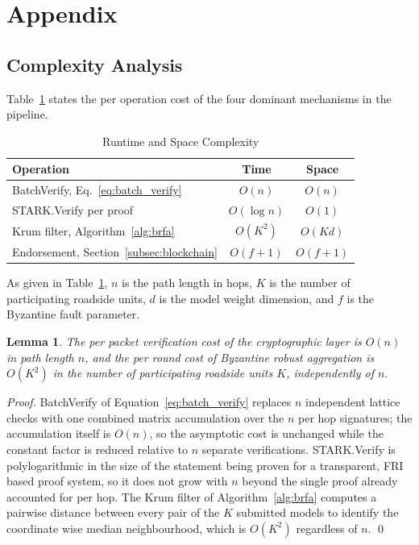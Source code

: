 \documentclass[lettersize,journal]{IEEEtran}
\theoremstyle{plain}
\newtheorem{lemma}{Lemma}
\theoremstyle{remark}
\begin{document}
	\section[\appendixname~\thesection]{Appendix}\label{appendix}
	
	\subsection{Complexity Analysis}\label{app:complexity}
	
	Table~\ref{tab:complexity} states the per operation cost of the four
	dominant mechanisms in the pipeline.
	\begin{table}[!t]
		\centering
		\caption{Runtime and Space Complexity}
		\label{tab:complexity}
		\renewcommand{\arraystretch}{1.2}
		\footnotesize
		\begin{tabular}{|l|c|c|}
			\hline
			\textbf{Operation} & \textbf{Time} & \textbf{Space} \\
			\hline
			BatchVerify, Eq.~\eqref{eq:batch_verify} & $O(n)$ & $O(n)$ \\
			\hline
			STARK.Verify per proof & $O(\log n)$ & $O(1)$ \\
			\hline
			Krum filter, Algorithm~\ref{alg:brfa} & $O(K^2)$ & $O(Kd)$ \\
			\hline
			Endorsement, Section~\ref{subsec:blockchain} & $O(f{+}1)$ & $O(f{+}1)$ \\
			\hline
		\end{tabular}
	\end{table}
	As given in Table~\ref{tab:complexity}, $n$ is the path length in hops,
	$K$ is the number of participating roadside units, $d$ is the model
	weight dimension, and $f$ is the Byzantine fault parameter.
	
	\begin{lemma}
		\label{lem:complexity}
		The per packet verification cost of the cryptographic layer is
		$O(n)$ in path length $n$, and the per round cost of Byzantine
		robust aggregation is $O(K^2)$ in the number of participating
		roadside units $K$, independently of $n$.
	\end{lemma}
	\begin{proof}
		BatchVerify of Equation~\eqref{eq:batch_verify} replaces $n$
		independent lattice checks with one combined matrix accumulation
		over the $n$ per hop signatures; the accumulation itself is
		$O(n)$, so the asymptotic cost is unchanged while the constant
		factor is reduced relative to $n$ separate verifications.
		STARK.Verify is polylogarithmic in the size of the statement being
		proven for a transparent, FRI based proof system, so it does not
		grow with $n$ beyond the single proof already accounted for per
		hop. The Krum filter of Algorithm~\ref{alg:brfa} computes a
		pairwise distance between every pair of the $K$ submitted models
		to identify the coordinate wise median neighbourhood, which is
		$O(K^2)$ regardless of $n$.
		\qed
	\end{proof}
	
\end{document}
